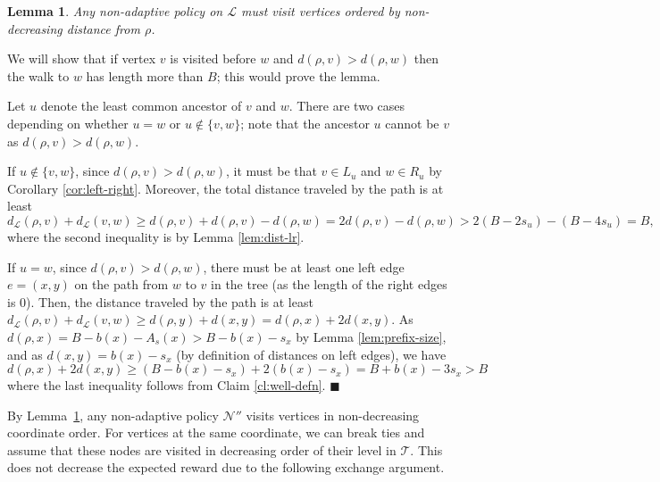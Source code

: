\documentclass[11pt,letterpaper]{article}
\newtheorem{lemma}[theorem]{Lemma}
\numberwithin{algorithm}{section}
\newenvironment{proof}{

\noindent{\bf Proof:}}
{\hfill$\blacksquare$


}
\newcommand{\lm}[0]{{\ensuremath{\mathcal{L}}}\xspace}
\newcommand{\N}[0]{{\ensuremath{\mathcal{N}}}\xspace}
\newcommand{\T}{\ensuremath{\mathcal{T}}\xspace}
\begin{document}
\begin{lemma}\label{lem:line-na-ordered}
Any non-adaptive policy on \lm must visit vertices ordered by non-decreasing distance from $\rho$.
\end{lemma}
\begin{proof}
We will show that if vertex $v$ is visited before $w$ and $d(\rho,v)>d(\rho,w)$ then the walk to $w$ has length more than $B$; this would prove the lemma.

Let $u$ denote the least common ancestor of $v$ and $w$.
There are two cases depending on whether $u=w$ or $u \notin \{v,w\}$; note that the ancestor $u$ cannot be $v$ as $d(\rho,v) > d(\rho,w)$.

If $u\notin\{v,w\}$, since $d(\rho,v) > d(\rho,w)$, it must be that $v \in L_u$ and $w\in R_u$ by Corollary \ref{cor:left-right}.
Moreover, the total distance traveled by the path is at least
$$d_\lm(\rho,v) + d_\lm(v,w) \ge d(\rho,v) + d(\rho,v) - d(\rho,w)  = 2 d(\rho,v) - d(\rho,w) >  2(B - 2 s_u)  - (B - 4 s_u) = B,$$  where the second inequality is  by Lemma \ref{lem:dist-lr}.


If $u=w$, since $d(\rho,v)>d(\rho,w)$, there must be at least one left edge $e=(x,y)$ on the path from $w$ to $v$ in the tree (as the length of the right edges is 0).  Then,
the distance traveled by the path is at least $d_\lm(\rho,v) + d_\lm(v,w) \ge  d(\rho,y) + d(x,y) = d(\rho,x) + 2d(x,y)$. As $d(\rho,x) = B-b(x) - A_s(x) > B-b(x) - s_x$ by Lemma \ref{lem:prefix-size},
 and as $d(x,y) =  b(x)-s_x$ (by definition of distances on left edges), we have
  $$  d(\rho,x) + 2d(x,y) \geq   (B - b(x) - s_x) + 2(b(x)-s_x) = B + b(x) - 3s_x > B$$
where the last inequality follows from Claim \ref{cl:well-defn}.
\end{proof}

By Lemma~\ref{lem:line-na-ordered}, any non-adaptive policy $\N''$ visits vertices in non-decreasing coordinate order. For vertices at the same coordinate, we can break ties and assume that these nodes are visited in decreasing order of their level in \T. This does not decrease the expected reward due to the following exchange argument.

\def\oN{\ensuremath{\overline{\cal N}}\xspace}
\end{document}
